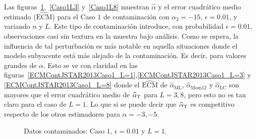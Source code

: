 
Las figuras~\ref{Caso1L1},~\ref{Caso1L3} y~\ref{Caso1L8} muestran $\widehat{\alpha}$ y el error cuadrático medio estimado ($\widehat{\text{ECM}}$) para el Caso $1$ de contaminación con $\alpha_2=-15$, $\epsilon=0.01$, y variando $n$ y $L$.  
Este tipo de contaminación introduce, con probabilidad $\epsilon=0.01$, observaciones casi sin textura en la muestra bajo análisis. Como se espera, la influencia de tal perturbación es más notable en aquella situaciones donde el modelo subyacente está más alejado de la contaminación. Es decir, para valores grandes de $\alpha$. Esto se ve con claridad en las figuras~\ref{ECMContJSTAR2013Caso1_L=1},\ref{ECMContJSTAR2013Caso1_L=3} y \ref{ECMContJSTAR2013Caso1_L=8} donde el $\widehat{\text{ECM}}$ de $\widehat\alpha_{\text{ML}}$, $\widehat\alpha_{\text{Mom12}}$ y $\widehat\alpha_{\text{LC}}$ son mayores que el error cuadrático medio de $\widehat\alpha_{\text T}$ para $L=3,8$, pero esto no es tan claro para el caso de $L=1$. Lo que si se puede decir que $\widehat\alpha_{\text T}$ es competitivo respecto de los otros estimadores para $\alpha=-3,-5$.

\begin{figure}[H]
	\caption{\label{Caso1L1}\small Datos contaminados: Caso $1$, $\epsilon=0.01$ y $L=1$.}
\end{figure}

